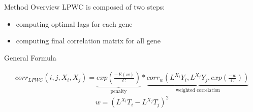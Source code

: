 \documentclass[10pt]{beamer}
\begin{document}
\begin{frame}{Method Overview}
LPWC is composed of two steps:
\begin{itemize}
\item computing optimal lags for each gene
\item computing final correlation matrix for all gene
\end{itemize}

General Formula

\begin{multline*}
corr_{LPWC}(i, j, X_i, X_j) = \underbrace{exp(\frac{- E(w)}{C})}_{\text{penalty}}  * 
\underbrace{corr_w(L^{X_i}Y_i, L^{X_j}Y_j, exp(\frac{- w}{C}))}_{\text{weighted correlation}}
\end{multline*}
$$w = (L^{X_i}T_i - L^{X_j}T_j)^2$$
\end{frame}
%
%
%
%
%
\end{document}

